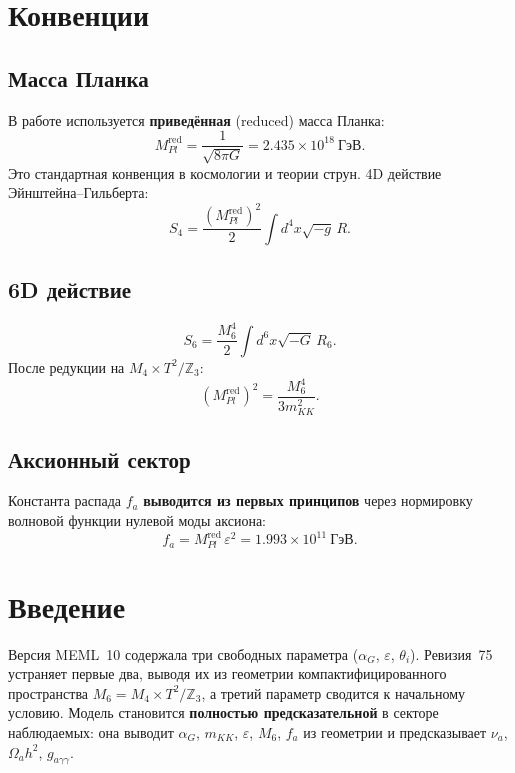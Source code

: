 \documentclass[12pt,a4paper]{article}
\numberwithin{equation}{section}
\begin{document}
\section{Конвенции}
\label{sec:conventions}

\subsection{Масса Планка}
В работе используется \textbf{приведённая} (reduced) масса Планка:
\begin{equation}
M_{Pl}^{\text{red}} = \frac{1}{\sqrt{8\pi G}} 
= 2.435\times 10^{18}~\text{ГэВ}.
\end{equation}
Это стандартная конвенция в космологии и теории струн. 4D действие 
Эйнштейна--Гильберта:
\begin{equation}
S_4 = \frac{(M_{Pl}^{\text{red}})^2}{2}\int d^4x\sqrt{-g}\,R.
\end{equation}

\subsection{6D действие}
\begin{equation}
S_6 = \frac{M_6^4}{2}\int d^6x\sqrt{-G}\,R_6.
\end{equation}
После редукции на $M_4\times T^2/\mathbb{Z}_3$:
\begin{equation}
(M_{Pl}^{\text{red}})^2 = \frac{M_6^4}{3m_{KK}^2}.
\label{eq:MPl-M6}
\end{equation}

\subsection{Аксионный сектор}
Константа распада $f_a$ \textbf{выводится из первых принципов} через 
нормировку волновой функции нулевой моды аксиона:
\begin{equation}
\boxed{\;f_a = M_{Pl}^{\text{red}}\,\varepsilon^2 = 
1.993\times 10^{11}~\text{ГэВ}.\;}
\end{equation}

\section{Введение}
Версия MEML~10 содержала три свободных параметра ($\alpha_G$, 
$\varepsilon$, $\theta_i$). Ревизия~75 устраняет первые два, выводя 
их из геометрии компактифицированного пространства $M_6 = M_4 \times 
T^2/\mathbb{Z}_3$, а третий параметр сводится к начальному условию. 
Модель становится \textbf{полностью предсказательной} в секторе 
наблюдаемых: она выводит $\alpha_G$, $m_{KK}$, $\varepsilon$, $M_6$, 
$f_a$ из геометрии и предсказывает $\nu_a$, $\Omega_a h^2$, 
$g_{a\gamma\gamma}$.
\end{document}

